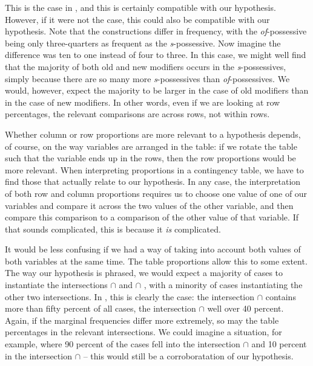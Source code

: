 This is the case in , and this is certainly compatible with our hypothesis.  However, if it were not the case, this could also be compatible with our hypothesis. Note that the constructions differ in frequency,  with the \textit{of}-possessive  being only three\hyp{}quarters as frequent as the \textit{s}-possessive. Now imagine the difference was ten to one instead of four to three. In this case, we might well find that the majority of both old and new modifiers occurs in the \textit{s}-possessives, simply because there are so many more \textit{s}-possessives than \textit{of}-possessives. We would, however, expect the majority to be larger in the case of old modifiers than in the case of new modifiers. In other words, even if we are looking at row percentages, the relevant comparisons are across rows, not within rows.

Whether column or row proportions are more relevant to a hypothesis  depends, of course, on the way variables are arranged in the table: if we rotate the table such that the variable   ends up in the rows, then the row proportions would be more relevant. When interpreting proportions in a contingency  table, we have to find those that actually relate to our hypothesis. In any case, the interpretation of both row and column proportions requires us to choose one value of one of our variables and compare it across the two values of the other variable, and then compare this comparison to a comparison of the other value of that variable. If that sounds complicated, this is because it \textit{is} complicated.

It would be less confusing if we had a way of taking into account both values of both variables at the same time. The table proportions allow this to some extent. The way our hypothesis  is phrased, we would expect a majority of cases to instantiate the intersections   $\cap$  and  $\cap$ , with a minority of cases instantiating the other two intersections. In , this is clearly the case: the intersection  $\cap$  contains more than fifty percent of all cases, the intersection  $\cap$  well over 40 percent. Again, if the marginal frequencies  differ more extremely, so may the table percentages in the relevant intersections. We could imagine a situation, for example, where 90 percent of the cases fell into the intersection   $\cap$  and 10 percent in the intersection  $\cap$  -- this would still be a corroboratation  of our  hypothesis.

